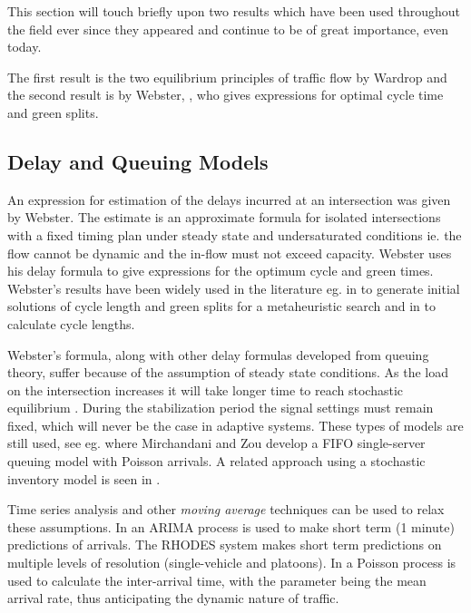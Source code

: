 \label{sec:history}

This section will touch briefly upon two results which have been used
throughout the field ever since they appeared and continue to be of
great importance, even today.

The first result is the two equilibrium principles of traffic flow by
Wardrop \cite{Wardrop} and the second result is by Webster,
\cite{Webster}, who gives expressions for optimal cycle time and green
splits.

\subsection{Delay and Queuing Models}
\label{sec:webster}

An expression for estimation of the delays incurred at an intersection
was given by Webster. The estimate is an approximate formula for
isolated intersections with a fixed timing plan under steady state and
undersaturated conditions ie. the flow cannot be dynamic and the
in-flow must not exceed capacity.  Webster uses his delay formula to
give expressions for the optimum cycle and green times.  Webster's
results have been widely used in the literature eg. in \cite{1} to
generate initial solutions of cycle length and green splits for a
metaheuristic search and in \cite{30} to calculate cycle lengths.

Webster's formula, along with other delay formulas developed from
queuing theory, suffer because of the assumption of steady state
conditions. As the load on the intersection increases it will take
longer time to reach stochastic equilibrium
\cite{traffictheory}. During the stabilization period the signal
settings must remain fixed, which will never be the case in adaptive
systems. These types of models are still used, see eg. \cite{38} where
Mirchandani and Zou develop a FIFO single-server queuing model with
Poisson arrivals. A related approach using a stochastic inventory
model is seen in \cite{10}.

Time series analysis and other \textit{moving average} techniques can
be used to relax these assumptions. In \cite{shortpredict} an ARIMA
process is used to make short term (1 minute) predictions of
arrivals. The RHODES system \cite{44} makes short term predictions on
multiple levels of resolution (single-vehicle and platoons). In
\cite{1} a Poisson process is used to calculate the inter-arrival time,
with the parameter being the mean arrival rate, thus anticipating the
dynamic nature of traffic.

